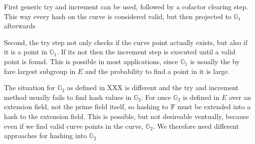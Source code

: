 First generic try and increment can be used, followed by a cofactor clearing step. This way every hash on the curve is considered valid, but then projected to $\mathbb{G}_1$ afterwards 

Second, the try step not only checks if the curve point actually exists, but also if it is a point in $\mathbb{G}_1$. If its not then the increment step is executed until a valid point is found. This is possible in most applications, since $\mathbb{G}_1$ is usually the by fare largest subgroup in $E$ and the probability to find a point in it is large.

The situation for $\mathbb{G}_2$ as defined in XXX is different and the try and increment method usually fails to find hash values in $\mathbb{G}_2$. For once $\mathbb{G}_2$ is defined in $E$ over an extension field, not the prime field itself, so hashing to $\mathbb{F}$ must be extended into a hash to the extension field. This is possible, but not desireable ventually, because even if we find valid curve points in the curve, $\mathbb{G}_2$. We therefore need different approaches for hashing into $\mathbb{G}_2$